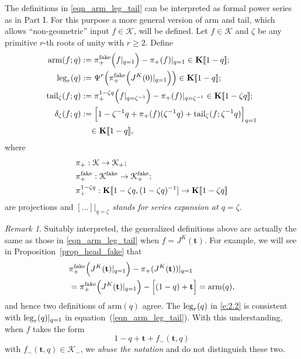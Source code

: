 \documentclass[11pt]{amsart}
\newtheorem*{main theorem*}{Main Theorem}
\theoremstyle{remark}
\newtheorem{remark}[theorem]{Remark}
\numberwithin{equation}{section}
\newcommand{\K}{\mathcal{K}}
\newcommand{\fake}{{\rm fake}}
\newcommand{\leg}{{\rm leg}}
\newcommand{\arm}{{\rm arm}}
\newcommand{\tail}{{\rm tail}}
\begin{document}
The definitions in \eqref{eqn_arm_leg_tail} can be interpreted as formal power series as in Part I. For this purpose a more general version of arm and tail, which allows ``non-geometric'' input $f\in \mathcal{K}$, will be defined. 
Let $f\in \mathcal{K}$ and $\zeta$ be any primitive $r$-th roots of unity with $r\geq 2$. Define
\begin{equation} \label{e:2.2}
\begin{split}
    \arm (f;q) &:= \pi^{\fake}_+ \Big( f|_{q=1} \Big) - \pi_+(f)|_{q=1}  \in \mathbf{K}[\![ 1-q ]\!];
    \\
    \leg_{r}(q) &:= \Psi^r \Big( \pi_+^{\fake} \Big(J^K(0)|_{q=1} \Big) \Big) \in \mathbf{K}[\![ 1-q ]\!];
    \\
    \tail_{\zeta} (f;q) & := \pi_+^{1-\zeta q}\Big( f|_{q=\zeta^{-1}}  \Big) - \pi_+(f)|_{q= \zeta^{-1}}  \in \mathbf{K}[\![ 1-\zeta q ]\!];
    \\
 \delta_{\zeta} (f; q) & := \Big[ 1- \zeta^{-1} q +  \pi_+(f)(\zeta^{-1} q) + {\rm tail}_{\zeta}(f; \zeta^{-1} q) \Big]_{q=1} \\
  & \quad \in \mathbf{K}[\![ 1-q ]\!],
\end{split}
\end{equation}
where
\[
\begin{split}
    &\pi_+ : \K \rightarrow \K_+ ;
    \\
    &\pi_+^{\fake} : \K^{\fake} \rightarrow \K_+^{\fake} ;
    \\
    &\pi_+^{1-\zeta q} : \mathbf{K}[\![ 1-\zeta q, (1-\zeta q)^{-1}] \rightarrow \mathbf{K}[\![ 1-\zeta q ]\!]
\end{split}
\]
are projections and \emph{$[...]|_{q=\zeta}$ stands for series expansion at $q=\zeta$}.


\begin{remark} \label{r:2.2}
Suitably interpreted, the generalized definitions above are actually the same as those in \eqref{eqn_arm_leg_tail} when $f= J^K(\mathbf{t})$. For example, we will see in Proposition~\ref{prop_head_fake} that
\[
\begin{split}
    &\pi_+^{\fake} \Big(J^K(\mathbf{t})|_{q=1} \Big)  - \pi_+(J^K(\mathbf{t}))|_{q=1}
    \\
    & = \pi_+^{\fake} \Big(J^K(\mathbf{t})|_{q=1} \Big) - \Big[ (1-q) + \mathbf{t} \Big] =  {\rm arm}(q),
\end{split}
\]
and hence two definitions of $\mathrm{arm}(q)$ agree.
The $\leg_r(q)$ in \eqref{e:2.2} is consistent with $\leg_r(q)|_{q=1}$ in equation~(\ref{eqn_arm_leg_tail}). 
With this understanding, when $f$ takes the form
\[
    1 - q + \mathbf{t} + f_-( \mathbf{t}, q ) 
\]
with $f_-(\mathbf{t},q) \in \K_-$, we \emph{abuse the notation} and do not distinguish these two.
\end{remark}
\end{document}
